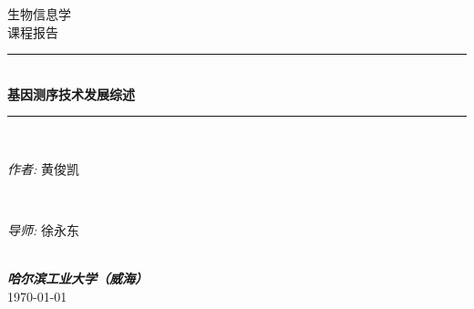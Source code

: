 \documentclass[12pt]{article} %
\begin{document}

\begin{titlepage}

\newcommand{\HRule}{\rule{\linewidth}{0.5mm}} %

\center %

\textsc{\Large 生物信息学}\\[0.5cm] %
\textsc{\large 课程报告}\\[0.5cm] %

\HRule \\[0.4cm]
{ \huge \bfseries 基因测序技术发展综述}\\[0.4cm] %
\HRule \\[1.5cm]

\begin{minipage}{0.4\textwidth}
\begin{flushleft} \large
\emph{作者:} 
黄俊凯%
\end{flushleft}
\end{minipage}
~
\begin{minipage}{0.4\textwidth}
\begin{flushright} \large
\emph{导师:} 
徐永东%
\end{flushright}
\end{minipage}\\[4cm]


\vfill
\textsc{\large  \textbf{\emph{哈尔滨工业大学（威海）}} }\\[0.5cm] 
{\large  \today}\\[2cm] %



\end{titlepage}

\end{document}
